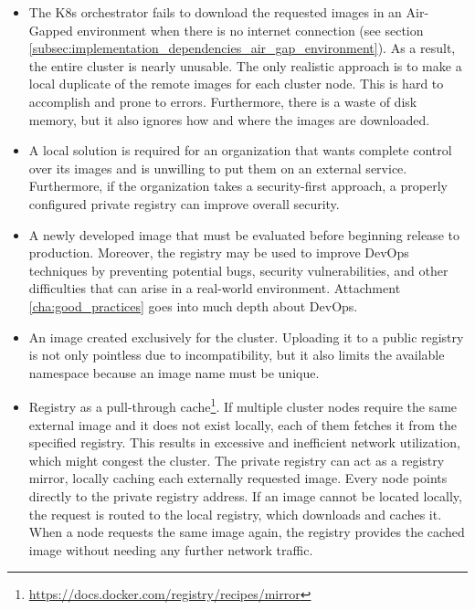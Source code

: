 \begin{itemize}
  \item The K8s orchestrator fails to download the requested images in an Air-Gapped
    environment when there is no internet connection (see section
    \ref{subsec:implementation_dependencies_air_gap_environment}). As a result, the
    entire cluster is nearly unusable. The only realistic approach is to make a
    local duplicate of the remote images for each cluster node. This is hard to accomplish
    and prone to errors. Furthermore, there is a waste of disk memory, but it
    also ignores how and where the images are downloaded.

  \item A local solution is required for an organization that wants complete control
    over its images and is unwilling to put them on an external service.
    Furthermore, if the organization takes a security-first approach, a properly
    configured private registry can improve overall security.

  \item A newly developed image that must be evaluated before beginning release to
    production. Moreover, the registry may be used to improve DevOps techniques by
    preventing potential bugs, security vulnerabilities, and other difficulties that
    can arise in a real-world environment. Attachment \ref{cha:good_practices}
    goes into much depth about DevOps.

  \item An image created exclusively for the cluster. Uploading it to a public
    registry is not only pointless due to incompatibility, but it also limits the
    available namespace because an image name must be unique.

  \item Registry as a pull-through cache\footnote{\url{https://docs.docker.com/registry/recipes/mirror}}.
    If multiple cluster nodes require the same external image and it does not
    exist locally, each of them fetches it from the specified registry. This
    results in excessive and inefficient network utilization, which might congest
    the cluster. The private registry can act as a registry mirror, locally caching
    each externally requested image. Every node points directly to the private
    registry address. If an image cannot be located locally, the request is
    routed to the local registry, which downloads and caches it. When a node
    requests the same image again, the registry provides the cached image without
    needing any further network traffic.
\end{itemize}

